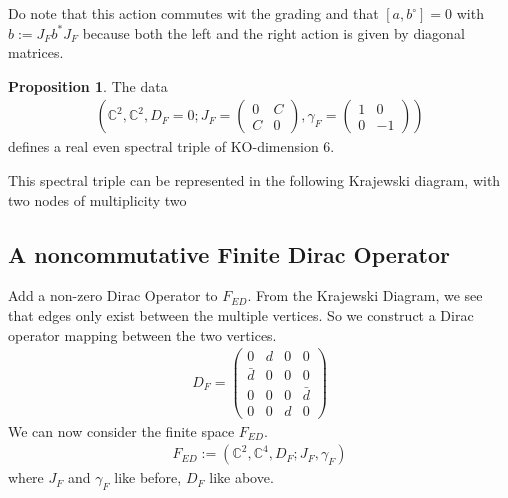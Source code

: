 \documentclass[a4paper]{article}
\theoremstyle{definition}
\theoremstyle{definition}
\theoremstyle{definition}
\theoremstyle{theorem}
\theoremstyle{theorem}
\theoremstyle{theorem}
\newtheorem{proposition}{Proposition}
\begin{document}
Do note that this action commutes wit the grading and that
$[a, b^\circ] = 0$ with $b:= J_F b^*J_F$  because both the left and the right
action is given by diagonal matrices.
\begin{proposition}
    The data
    \begin{align}
        \left( \mathbb{C}^2, \mathbb{C}^2, D_F=0; J_F =
        \begin{pmatrix}
            0 & C \\ C &0
        \end{pmatrix},
        \gamma _F =
        \begin{pmatrix}
            1 & 0 \\ 0 &-1
        \end{pmatrix}
        \right)
    \end{align}
    defines a real even spectral triple of KO-dimension 6.
\end{proposition}
This spectral triple can be represented in the following Krajewski diagram,
with two nodes of multiplicity two
    \begin{figure}[h!] \centering
    \end{figure}
\subsection{A noncommutative Finite Dirac Operator}
Add a non-zero Dirac Operator to $F_{ED}$. From the Krajewski Diagram, we see
that edges only exist between the multiple vertices. So we construct a Dirac
operator mapping between the two vertices.
\begin{align}\label{dirac}
    D_F =
    \begin{pmatrix}
    0 & d & 0 & 0 \\
    \bar{d} & 0 & 0 & 0 \\
    0 & 0 & 0 & \bar{d} \\
    0 & 0 & d & 0
    \end{pmatrix}
\end{align}
We can now consider the finite space $F_{ED}$.
\begin{align}
    F_{ED} := (\mathbb{C}^2, \mathbb{C}^4, D_F; J_F, \gamma_F)
\end{align}
where $J_F$ and $\gamma_F$ like before, $D_F$ like above.
\end{document}
